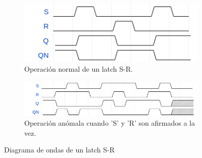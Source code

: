 \begin{figure}[h]
    \centering
  
    \begin{subfigure}[b]{0.35\textwidth}
      \includegraphics[width=\textwidth]{figs/wavedrom-latch-sr.png}
      \caption{Operación normal de un latch S-R.}
      \label{fig:wave-latch-sr1}
    \end{subfigure}
    \hfill
    \begin{subfigure}[b]{0.55\textwidth}
      \includegraphics[width=\textwidth]{figs/wavedrom-latch-sr2.png}
      \caption{Operación anómala cuando 'S' y 'R' son afirmados a la vez.}
      \label{fig:wave-latch-sr2}
    \end{subfigure}
  
    \caption{Diagrama de ondas de un latch S-R}
    \label{fig:wave-latch-sr}
  \end{figure}